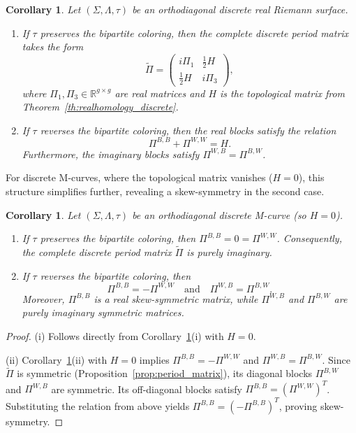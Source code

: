 \documentclass[11pt,a4paper]{article}
\newtheorem{corollary}[theorem]{Corollary}
\theoremstyle{definition}
\newcommand{\R}{\mathds{R}}
\begin{document}
\begin{corollary}\label{cor:matrix_real_structure}
	Let $(\Sigma, \Lambda, \tau)$ be an orthodiagonal discrete real Riemann surface.
	\begin{enumerate}
		\item[(i)] If $\tau$ preserves the bipartite coloring, then the complete discrete period matrix takes the form
		\[ \tilde{\Pi} = \begin{pmatrix}
			i \Pi_1 & \frac{1}{2} H \\
			\frac{1}{2} H & i \Pi_3
		\end{pmatrix}, \]
		where $\Pi_1, \Pi_3 \in \R^{g \times g}$ are real matrices and $H$ is the topological matrix from Theorem~\ref{th:realhomology_discrete}.
		\item[(ii)] If $\tau$ reverses the bipartite coloring, then the real blocks satisfy the relation
		\[ \Pi^{B,B} + \Pi^{W,W} = H. \]
		Furthermore, the imaginary blocks satisfy $\Pi^{W,B} = \Pi^{B,W}$.
	\end{enumerate}
\end{corollary}

For discrete M-curves, where the topological matrix vanishes ($H=0$), this structure simplifies further, revealing a skew-symmetry in the second case.

\begin{corollary}\label{cor:matrix_real_structureM}
	Let $(\Sigma, \Lambda, \tau)$ be an orthodiagonal discrete M-curve (so $H=0$).
	\begin{enumerate}
		\item[(i)] If $\tau$ preserves the bipartite coloring, then $\Pi^{B,B} = 0 = \Pi^{W,W}$. Consequently, the complete discrete period matrix $\tilde{\Pi}$ is purely imaginary.
		\item[(ii)] If $\tau$ reverses the bipartite coloring, then
		\[ \Pi^{B,B} = -\Pi^{W,W} \quad \text{and} \quad \Pi^{W,B} = \Pi^{B,W}. \]
		Moreover, $\Pi^{B,B}$ is a real skew-symmetric matrix, while $\Pi^{W,B}$ and $\Pi^{B,W}$ are purely imaginary symmetric matrices.
	\end{enumerate}
\end{corollary}

\begin{proof}
	(i) Follows directly from Corollary~\ref{cor:matrix_real_structure}(i) with $H=0$.
	
	(ii) Corollary~\ref{cor:matrix_real_structure}(ii) with $H=0$ implies $\Pi^{B,B} = -\Pi^{W,W}$ and $\Pi^{W,B} = \Pi^{B,W}$.
	Since $\tilde{\Pi}$ is symmetric (Proposition~\ref{prop:period_matrix}), its diagonal blocks $\Pi^{B,W}$ and $\Pi^{W,B}$ are symmetric. Its off-diagonal blocks satisfy $\Pi^{B,B} = (\Pi^{W,W})^T$. Substituting the relation from above yields $\Pi^{B,B} = (-\Pi^{B,B})^T$, proving skew-symmetry.
\end{proof}
\end{document}
